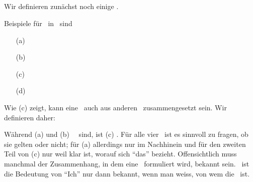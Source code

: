 \subsection[Aussagen]{\Aussagen}%
\label {sub:Aussagen}

Wir definieren zunächst noch einige \Begriffe.
\begin{description}
	\item[] 
	\item[]       
\end{description}
Beispiele für \Aussagen\ in \Metasprache\ sind
\begin{enumerate}
	\item[(a)] \label{Bsp:a} 
	\item[(b)] \label{Bsp:b} 
	\item[(c)] \label{Bsp:c} 
	\item[(d)] \label{Bsp:d} 
\end{enumerate}
Wie (c) zeigt, kann eine \Aussage\ auch aus anderen \Aussagen\ zusammengesetzt sein.
Wir definieren daher:
\begin{description}
	\item[]       
	\item[]  
	\item[]    
	\item[] 
\end{description}
Während (a) und (b) \atomare\ \Aussagen\ sind, ist (c) \zerlegbarA.
Für alle vier \Aussagen\ ist es sinnvoll zu fragen, ob sie gelten oder nicht;
für (a) allerdings nur im Nachhinein und für den zweiten Teil von (c) nur weil klar ist, worauf sich "`das"' bezieht.
Offensichtlich muss manchmal der Zusammenhang, in dem eine \Aussage\ formuliert wird, bekannt sein.
\textZB\ ist die Bedeutung von "`Ich"' nur dann bekannt, wenn man weiss, von wem die \Aussage\ ist.

